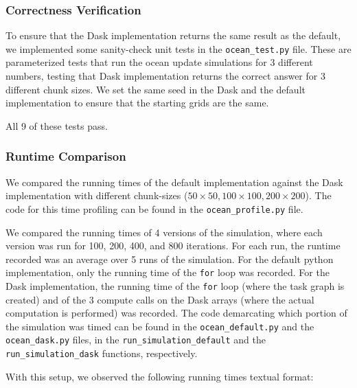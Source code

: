 \documentclass[a4paper,12pt]{article}
\begin{document}
\subsubsection{Correctness Verification}
To ensure that the Dask implementation returns the same result as the default, we implemented some sanity-check unit tests in the \verb|ocean_test.py| file. These are parameterized tests that run the ocean update simulations for 3 different numbers, testing that Dask implementation returns the correct answer for 3 different chunk sizes. We set the same seed in the Dask and the default implementation to ensure that the starting grids are the same. 

All 9 of these tests pass.

\subsubsection{Runtime Comparison}
We compared the running times of the default implementation against the Dask implementation with different chunk-sizes ($50 \times 50, 100 \times 100, 200 \times 200$). The code for this time profiling can be found in the \verb|ocean_profile.py| file. 

We compared the running times of 4 versions of the simulation, where each version was run for 100, 200, 400, and 800 iterations. For each run, the runtime recorded was an average over 5 runs of the simulation. For the default python implementation, only the running time of the \verb|for| loop was recorded. For the Dask implementation, the running time of the \verb|for| loop (where the task graph is created) and of the 3 compute calls on the Dask arrays (where the actual computation is performed) was recorded. The code demarcating which portion of the simulation was timed can be found in the \verb|ocean_default.py| and the \verb|ocean_dask.py| files, in the \verb|run_simulation_default| and the \verb|run_simulation_dask| functions, respectively.

With this setup, we observed the following running times textual format: 
\end{document}
